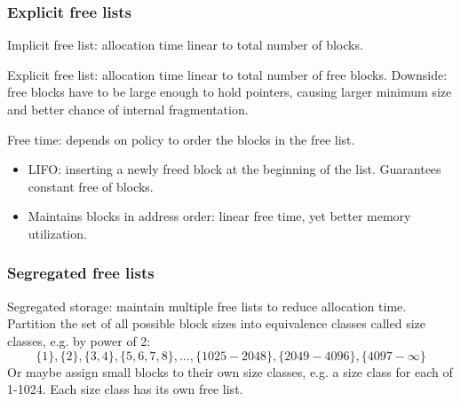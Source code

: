 \subsubsection{Explicit free lists}
Implicit free list: allocation time linear to total number of blocks. 

Explicit free list: allocation time linear to total number of free blocks. Downside: free blocks have to be large enough to hold pointers, causing larger minimum size and better chance of internal fragmentation.
\begin{figure}[ht]
\end{figure}
Free time: depends on policy to order the blocks in the free list.
\begin{itemize}
	\item LIFO: inserting a newly freed block at the beginning of the list. Guarantees constant free of blocks.
	\item Maintains blocks in address order: linear free time, yet better memory utilization. 
\end{itemize}
\subsubsection{Segregated free lists}
Segregated storage: maintain multiple free lists to reduce allocation time. Partition the set of all possible block sizes into equivalence classes called size classes, e.g. by power of 2:
\[\{1\}, \{2\},\{3,4\},\{5,6,7,8\},\dots,\{1025-2048\},\{2049-4096\},\{4097-\infty\}\]
Or maybe assign small blocks to their own size classes, e.g. a size class for each of 1-1024. Each size class has its own free list. 
